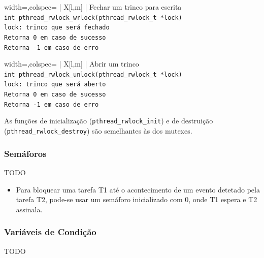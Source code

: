 \documentclass[11pt]{article}
\begin{document}
\begin{tblr}{width=\linewidth,colspec={ | X[l,m] | }}
    \hline
    \centering Fechar um trinco para escrita                      \\\hline
    \lstinline|int pthread_rwlock_wrlock(pthread_rwlock_t *lock)| \\\hline
    \lstinline|lock: trinco que será fechado|                     \\\hline
    \lstinline|Retorna 0 em caso de sucesso|                      \\
    \lstinline|Retorna -1 em caso de erro|                        \\\hline
\end{tblr}

\begin{tblr}{width=\linewidth,colspec={ | X[l,m] | }}
    \hline
    \centering Abrir um trinco                                    \\\hline
    \lstinline|int pthread_rwlock_unlock(pthread_rwlock_t *lock)| \\\hline
    \lstinline|lock: trinco que será aberto|                      \\\hline
    \lstinline|Retorna 0 em caso de sucesso|                      \\
    \lstinline|Retorna -1 em caso de erro|                        \\\hline
\end{tblr}

As funções de inicialização (\lstinline|pthread_rwlock_init|) e de destruição (\lstinline|pthread_rwlock_destroy|) são semelhantes às dos mutexes.

\subsubsection{Semáforos}

TODO

\begin{itemize}
    \item Para bloquear uma tarefa T1 até o acontecimento de um evento detetado pela tarefa T2, pode-se usar um semáforo inicializado com 0, onde T1 espera e T2 assinala.
\end{itemize}

\subsubsection{Variáveis de Condição}

TODO
\end{document}
